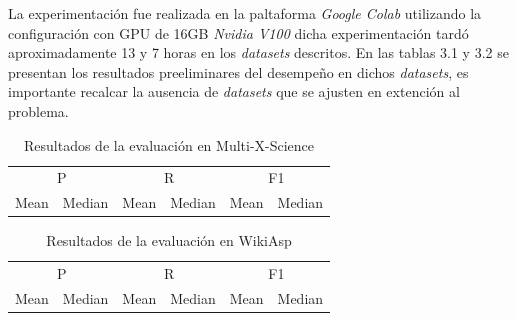 La experimentación fue realizada en la paltaforma \emph{Google Colab} utilizando la configuración con GPU de 16GB \emph{Nvidia V100} dicha experimentación tardó aproximadamente 13 y 7 horas en los \emph{datasets} descritos. En las tablas 3.1 y 3.2 se presentan los resultados preeliminares del desempeño en dichos \emph{datasets}, es importante recalcar la ausencia de \emph{datasets} que se ajusten en extención al problema.

\begin{table}[htb]
    \centering
    \label{tab:example}
    \begin{tabular}{*6c}
      \toprule
      \multicolumn{2}{c}{P}  & \multicolumn{2}{c}{R} & \multicolumn{2}{c}{F1} \\ \cmidrule(r){1-2} \cmidrule(r){3-4} \cmidrule(l){5-6}
      Mean & Median  &  Mean & Median &     Mean & Median   \\
                                                      
      \bottomrule
    \end{tabular}
    \caption{Resultados de la evaluación en Multi-X-Science}

  \end{table}

  \begin{table}[htb]
    \centering
    \label{tab:example}
    \begin{tabular}{*6c}
      \toprule
      \multicolumn{2}{c}{P}  & \multicolumn{2}{c}{R} & \multicolumn{2}{c}{F1} \\ \cmidrule(r){1-2} \cmidrule(r){3-4} \cmidrule(l){5-6}
      Mean & Median  &  Mean & Median &     Mean & Median   \\
                                                      
      \bottomrule
    \end{tabular}
    \caption{Resultados de la evaluación en WikiAsp}

  \end{table}